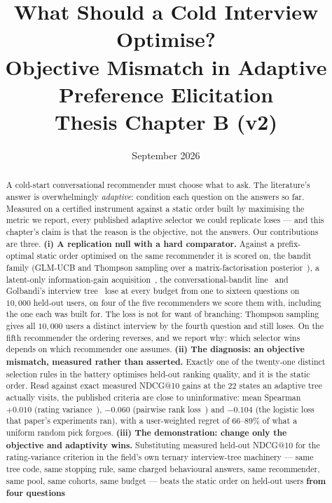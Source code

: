 \documentclass[11pt]{article}
\title{\textbf{What Should a Cold Interview Optimise?\\Objective Mismatch in Adaptive Preference
Elicitation}\\[4pt]\large Thesis Chapter B (v2)}
\author{}
\date{September 2026}
\begin{document}
\maketitle

\begin{abstract}
\noindent A cold-start conversational recommender must choose what to ask. The literature's answer is
overwhelmingly \emph{adaptive}: condition each question on the answers so far. Measured on a certified
instrument against a static order built by maximising the metric we report, every published adaptive
selector we could replicate loses --- and this chapter's claim is that the reason is the objective,
not the answers. Our contributions are three. \textbf{(i) A replication null with a hard comparator.}
Against a prefix-optimal static order optimised on the same recommender it is scored on, the bandit
family (GLM-UCB and Thompson sampling over a matrix-factorisation
posterior~\cite{zhao2013interactive}), a latent-only information-gain acquisition~\cite{ma2019eddi}, the
conversational-bandit line~\cite{zhang2020conucb,wang2023conlinucb,liu2025clisk} and Golbandi's
interview tree~\cite{golbandi2011adaptive} lose at every budget from one to sixteen questions on
$10{,}000$ held-out users, on four of the five recommenders we score them with, including the one each
was built for. The loss is not for want of branching: Thompson sampling gives all $10{,}000$ users a
distinct interview by the fourth question and still loses. On the fifth recommender the ordering
reverses, and we report why: which selector wins depends on which recommender one assumes.
\textbf{(ii) The diagnosis: an objective mismatch, measured rather than asserted.} Exactly one of the
twenty-one distinct selection rules in the battery optimises held-out ranking quality, and it is the
static order. Read against exact measured NDCG@10 gains at the $22$ states an adaptive tree actually
visits, the published criteria are close to uninformative: mean Spearman $+0.010$ (rating
variance~\cite{golbandi2011adaptive}), $-0.060$ (pairwise rank loss~\cite{hu2013interview}) and
$-0.104$ (the logistic loss that paper's experiments ran), with a user-weighted regret of $66$--$89\%$
of what a uniform random pick forgoes.
\textbf{(iii) The demonstration: change only the objective and adaptivity wins.} Substituting measured
held-out NDCG@10 for the rating-variance criterion in the field's own ternary interview-tree machinery
--- same tree code, same stopping rule, same charged behavioural answers, same recommender, same pool,
same cohorts, same budget --- beats the static order on held-out users \textbf{from four questions
}
\end{abstract}
\end{document}
